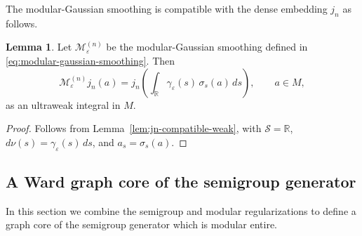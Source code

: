\documentclass[11pt,a4paper]{article}
\theoremstyle{plain}
\numberwithin{theorem}{section}
\theoremstyle{definition}
\newtheorem{lemma}[theorem]{Lemma}
\newcommand{\?}{\overset{?}{=}}
\begin{document}
The modular-Gaussian smoothing is compatible with the dense embedding $j_n$ as follows.
\begin{lemma}\label{lem:modular-gaussian-dense-core}
Let $\mathcal M_\varepsilon^{(n)}$ be the modular-Gaussian smoothing defined in \eqref{eq:modular-gaussian-smoothing}. 
Then
\begin{equation}\label{eq:modular-gaussian-dense-core-act}
     \mathcal M_\varepsilon^{(n)}j_n(a)=j_n\!\left(\int_{\mathbb R}\gamma_\varepsilon(s)\,\sigma_s(a)\,ds\right),\qquad a\in M,
\end{equation}
as an ultraweak integral in $M$. 
\end{lemma}

\begin{proof}
Follows from Lemma~\ref{lem:jn-compatible-weak}, with $\mathcal S=\mathbb R$, $d\nu(s)= \gamma_{\varepsilon}(s)\, ds$, and $a_s = \sigma_s(a)$.
\end{proof}

\subsection{A Ward graph core of the semigroup generator}
\label{subsec:ward-graph-core}

In this section we combine the semigroup and modular regularizations to define a graph core of the semigroup generator which is modular entire. 
\end{document}
